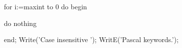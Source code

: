 \documentclass[10pt,a4paper]{book}
\begin{document}
\begin{lstlistingUP}
	for i:=maxint to 0 do begin
\end{lstlistingUP}

\begin{lstlistingMIDDLE}
		{
			do nothing
		}
\end{lstlistingMIDDLE}

\begin{lstlistingDOWN}
	end;
	Write(’Case insensitive ’); 
	WritE(’Pascal keywords.’);
\end{lstlistingDOWN}
\end{document}
